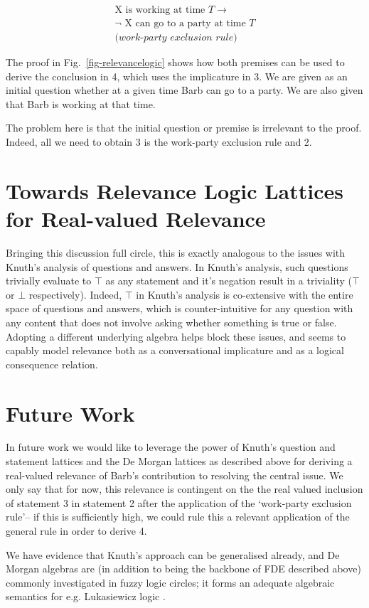 \documentclass[11pt,a4paper]{article}
\theoremstyle{definition}
\begin{document}
\begin{align}
    \label{def:workpartyexclusion}  \text{X is working at time }T \rightarrow \nonumber \\
    \neg\text{ X can go to a party at time }T\nonumber \\
    \textit{(work-party exclusion rule)}
\end{align}


The proof in Fig.~\ref{fig-relevancelogic} shows how both premises can be used to derive the conclusion in 4, which uses the implicature in 3. We are given as an initial question whether at a given time Barb can go to a party. We are also given that Barb is working at that time.

The problem here is that the initial question or premise is irrelevant to the proof. Indeed, all we need to obtain 3 is the work-party exclusion rule and 2.

\section{Towards Relevance Logic Lattices for Real-valued Relevance}

Bringing this discussion full circle, this is exactly analogous to the issues with Knuth's analysis of questions and answers. In Knuth's analysis, such questions trivially evaluate to $\top$ as any statement and it's negation result in a triviality ($\top$ or $\bot$ respectively). Indeed, $\top$ in Knuth's analysis is co-extensive with the entire space of questions and answers, which is counter-intuitive for any question with any content that does not involve asking whether something is true or false. Adopting a different underlying algebra helps block these issues, and seems to capably model relevance both as a conversational implicature and as a logical consequence relation.  

\section{Future Work}
In future work we would like to leverage the power of Knuth's question and statement lattices and the De Morgan lattices as described above for deriving a real-valued relevance of Barb's contribution to resolving the central issue. We only say that for now, this relevance is contingent on the the real valued inclusion of statement 3 in statement 2 after the application of the `work-party exclusion rule'-- if this is sufficiently high, we could rule this a relevant application of the general rule in order to derive 4.
\par We have evidence that Knuth's approach can be generalised already, and De Morgan algebras are (in addition to being the backbone of FDE described above) commonly investigated in fuzzy logic circles; it  forms an adequate algebraic semantics for e.g. Lukasiewicz logic \cite{Nguyen:1996:FCF:235242}. 
\end{document}
